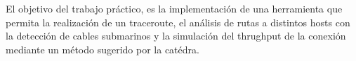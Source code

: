 El objetivo del trabajo práctico, es la implementación de una herramienta que permita la realización de un traceroute, el análisis de rutas a distintos hosts con la detección de cables submarinos y la simulación del thrughput de la conexión mediante un método sugerido por la catédra. %